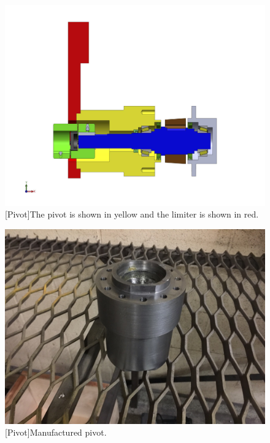 \begin{figure}[H]
\centering
\begin{minipage}{0.45\linewidth}
\centering
\includegraphics[width=0.9\linewidth]{./images/pivot_assembly_drw}
[Pivot]{The pivot is shown in yellow and the limiter is shown in red.}
\label{fig:pivot_assembly_drw}
\end{minipage}
\begin{minipage}{0.45\linewidth}
\centering
\includegraphics[width=0.9\linewidth]{./images/pivot_bld}
[Pivot]{Manufactured pivot.}
\label{fig:pivot_bld}
\end{minipage}
\end{figure}
\newpage



